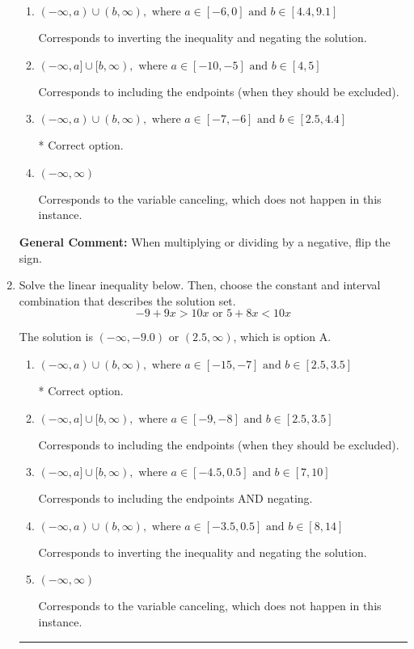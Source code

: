 \documentclass{extbook}[14pt]
\newcommand{\litem}[1]{\item #1

\rule{\textwidth}{0.4pt}}
\begin{document}
\begin{enumerate}
{\begin{enumerate}[label=\Alph*.]
Corresponds to including the endpoints AND negating.
\item \( (-\infty, a) \cup (b, \infty), \text{ where } a \in [-6, 0] \text{ and } b \in [4.4, 9.1] \)

Corresponds to inverting the inequality and negating the solution.
\item \( (-\infty, a] \cup [b, \infty), \text{ where } a \in [-10, -5] \text{ and } b \in [4, 5] \)

Corresponds to including the endpoints (when they should be excluded).
\item \( (-\infty, a) \cup (b, \infty), \text{ where } a \in [-7, -6] \text{ and } b \in [2.5, 4.4] \)

 * Correct option.
\item \( (-\infty, \infty) \)

Corresponds to the variable canceling, which does not happen in this instance.
\end{enumerate}

\textbf{General Comment:} When multiplying or dividing by a negative, flip the sign.
}
\litem{
Solve the linear inequality below. Then, choose the constant and interval combination that describes the solution set.
\[ -9 + 9 x > 10 x \text{ or } 5 + 8 x < 10 x \]

The solution is \( (-\infty, -9.0) \text{ or } (2.5, \infty) \), which is option A.\begin{enumerate}[label=\Alph*.]
\item \( (-\infty, a) \cup (b, \infty), \text{ where } a \in [-15, -7] \text{ and } b \in [2.5, 3.5] \)

 * Correct option.
\item \( (-\infty, a] \cup [b, \infty), \text{ where } a \in [-9, -8] \text{ and } b \in [2.5, 3.5] \)

Corresponds to including the endpoints (when they should be excluded).
\item \( (-\infty, a] \cup [b, \infty), \text{ where } a \in [-4.5, 0.5] \text{ and } b \in [7, 10] \)

Corresponds to including the endpoints AND negating.
\item \( (-\infty, a) \cup (b, \infty), \text{ where } a \in [-3.5, 0.5] \text{ and } b \in [8, 14] \)

Corresponds to inverting the inequality and negating the solution.
\item \( (-\infty, \infty) \)

Corresponds to the variable canceling, which does not happen in this instance.
\end{enumerate}

}
\end{enumerate}
\end{document}

